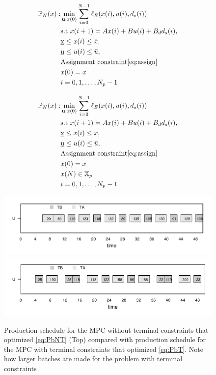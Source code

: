 \documentclass[10pt]{article}
\newcommand{\bu}{\mathbf{u}}
\theoremstyle{definition}
\begin{document}
\begin{alignat}{1}
\label{eq:PbNT}
\mathbb{P}_N(x):& \min_{\bu,x(0)}{\sum_{i=0}^{N-1}\ell_E(x(i),u(i),d_s(i))} \nonumber \\
&\text{s.t~} x(i+1) = Ax(i) + Bu(i)+B_dd_s(i), \nonumber\\
&\underbar{x} \leq x(i) \leq \bar{x},  \\
&\underbar{u} \leq u(i) \leq \bar{u}, \nonumber \\
& \text{Assignment constraint}\eqref{eq:assign} \nonumber\\
& x(0) = x \nonumber\\
&i = 0,1,\ldots,N_p-1\nonumber
\end{alignat}

\begin{alignat}{1}
\label{eq:PbT}
\mathbb{P}_N(x):& \min_{\bu,x(0)}{\sum_{i=0}^{N-1}\ell_E(x(i),u(i),d_s(i))} \nonumber \\
&\text{s.t~} x(i+1) = Ax(i) + Bu(i)+B_dd_s(i), \nonumber\\
&\underbar{x} \leq x(i) \leq \bar{x},  \\
&\underbar{u} \leq u(i) \leq \bar{u}, \nonumber \\
& \text{Assignment constraint}\eqref{eq:assign} \nonumber\\
& x(0) = x \nonumber \\
& x(N) \in \mathbb{X}_p \nonumber\\
&i = 0,1,\ldots,N_p-1\nonumber
\end{alignat}


\begin{figure}
\begin{center}
\includegraphics{NTS_gantt.pdf}
\includegraphics{TS_gantt.pdf}
\caption{Production schedule for the MPC without terminal constraints that optimized
  \eqref{eq:PbNT} (Top) compared with production schedule for the MPC
  with terminal constraints that optimized \eqref{eq:PbT}. Note how larger batches are made for
  the problem with terminal constraints}
\end{center}
\label{fig:gantt_TNT}
\end{figure}
\end{document}
